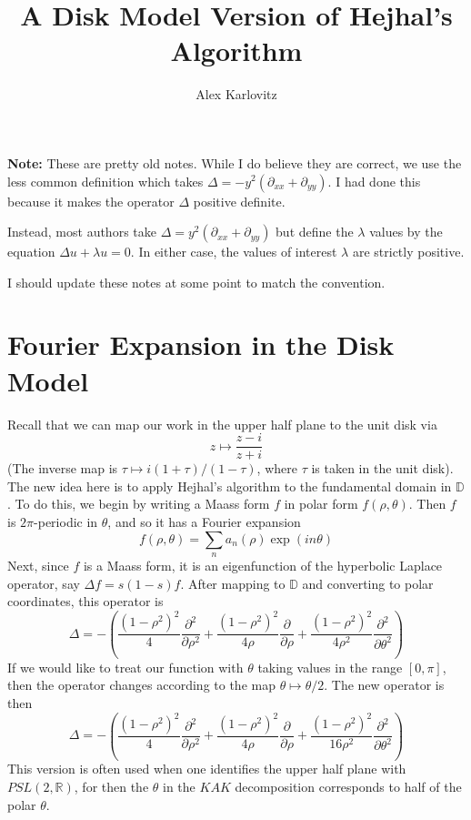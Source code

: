\documentclass[]{article}
\title{A Disk Model Version of Hejhal's Algorithm}
\author{Alex Karlovitz}
\date{}
\begin{document}
	
	\maketitle
	
\textbf{Note:} These are pretty old notes.
While I do believe they are correct, we use the less common definition which takes $\Delta = -y^2(\partial_{xx} + \partial_{yy})$.
I had done this because it makes the operator $\Delta$ positive definite.

Instead, most authors take $\Delta = y^2(\partial_{xx} + \partial_{yy})$ but define the $\lambda$ values by the equation $\Delta u + \lambda u = 0$.
In either case, the values of interest $\lambda$ are strictly positive.

I should update these notes at some point to match the convention.
	
\section{Fourier Expansion in the Disk Model}

Recall that we can map our work in the upper half plane to the unit disk via
$$
z \mapsto \frac{z - i}{z + i}
$$
(The inverse map is $\tau \mapsto i(1+\tau)/(1-\tau)$, where $\tau$ is taken in the unit disk).
\\

The new idea here is to apply Hejhal's algorithm to the fundamental domain in $\mathbb{D}$.
To do this, we begin by writing a Maass form $f$ in polar form $f(\rho, \theta)$.
Then $f$ is $2\pi$-periodic in $\theta$, and so it has a Fourier expansion
$$
f(\rho, \theta) = \sum_n a_n(\rho)\exp(in\theta)
$$
Next, since $f$ is a Maass form, it is an eigenfunction of the hyperbolic Laplace operator, say $\Delta f = s(1-s)f$.
After mapping to $\mathbb{D}$ and converting to polar coordinates, this operator is
\begin{equation}\label{laplaceBeltrami}
\Delta = -\left(\frac{(1 - \rho^2)^2}{4}\frac{\partial^2}{\partial\rho^2} +
\frac{(1 - \rho^2)^2}{4\rho}\frac{\partial}{\partial\rho} +
\frac{(1 - \rho^2)^2}{4\rho^2}\frac{\partial^2}{\partial\theta^2}\right)
\end{equation}
If we would like to treat our function with $\theta$ taking values in the range $[0, \pi]$, then the operator changes according to the map $\theta \mapsto \theta/2$.
The new operator is then
$$
\Delta = -\left(\frac{(1 - \rho^2)^2}{4}\frac{\partial^2}{\partial\rho^2} +
\frac{(1 - \rho^2)^2}{4\rho}\frac{\partial}{\partial\rho} +
\frac{(1 - \rho^2)^2}{16\rho^2}\frac{\partial^2}{\partial\theta^2}\right)
$$
This version is often used when one identifies the upper half plane with $PSL(2, \mathbb{R})$, for then the $\theta$ in the $KAK$ decomposition corresponds to half of the polar $\theta$.
\end{document}
